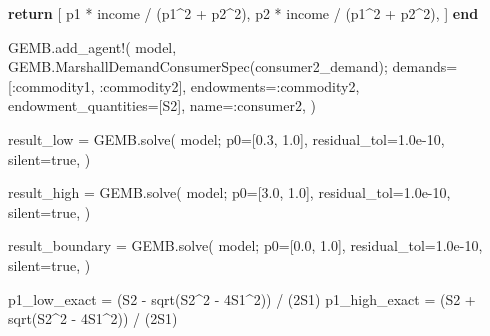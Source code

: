 \documentclass[
  letterpaper,
  DIV=11,
  numbers=noendperiod]{scrreprt}
\newenvironment{Shaded}{\begin{snugshade}}{\end{snugshade}}
\newcommand{\ConstantTok}[1]{\textcolor[rgb]{0.56,0.35,0.01}{#1}}
\newcommand{\ControlFlowTok}[1]{\textcolor[rgb]{0.00,0.23,0.31}{\textbf{#1}}}
\newcommand{\FloatTok}[1]{\textcolor[rgb]{0.68,0.00,0.00}{#1}}
\newcommand{\FunctionTok}[1]{\textcolor[rgb]{0.28,0.35,0.67}{#1}}
\newcommand{\KeywordTok}[1]{\textcolor[rgb]{0.00,0.23,0.31}{\textbf{#1}}}
\newcommand{\NormalTok}[1]{\textcolor[rgb]{0.00,0.23,0.31}{#1}}
\newcommand{\OperatorTok}[1]{\textcolor[rgb]{0.37,0.37,0.37}{#1}}
\begin{document}
\begin{codelisting}
{\begin{Shaded}
\begin{Highlighting}[]
    \ControlFlowTok{return}\NormalTok{ [}
\NormalTok{        p1 }\OperatorTok{*}\NormalTok{ income }\OperatorTok{/}\NormalTok{ (p1}\OperatorTok{\^{}}\FloatTok{2} \OperatorTok{+}\NormalTok{ p2}\OperatorTok{\^{}}\FloatTok{2}\NormalTok{),}
\NormalTok{        p2 }\OperatorTok{*}\NormalTok{ income }\OperatorTok{/}\NormalTok{ (p1}\OperatorTok{\^{}}\FloatTok{2} \OperatorTok{+}\NormalTok{ p2}\OperatorTok{\^{}}\FloatTok{2}\NormalTok{),}
\NormalTok{    ]}
\KeywordTok{end}

\NormalTok{GEMB.}\FunctionTok{add\_agent!}\NormalTok{(}
\NormalTok{    model,}
\NormalTok{    GEMB.}\FunctionTok{MarshallDemandConsumerSpec}\NormalTok{(consumer2\_demand);}
\NormalTok{    demands}\OperatorTok{=}\NormalTok{[}\OperatorTok{:}\NormalTok{commodity1, }\OperatorTok{:}\NormalTok{commodity2],}
\NormalTok{    endowments}\OperatorTok{=:}\NormalTok{commodity2,}
\NormalTok{    endowment\_quantities}\OperatorTok{=}\NormalTok{[S2],}
\NormalTok{    name}\OperatorTok{=:}\NormalTok{consumer2,}
\NormalTok{)}

\NormalTok{result\_low }\OperatorTok{=}\NormalTok{ GEMB.}\FunctionTok{solve}\NormalTok{(}
\NormalTok{    model;}
\NormalTok{    p0}\OperatorTok{=}\NormalTok{[}\FloatTok{0.3}\NormalTok{, }\FloatTok{1.0}\NormalTok{],}
\NormalTok{    residual\_tol}\OperatorTok{=}\FloatTok{1.0e{-}10}\NormalTok{,}
\NormalTok{    silent}\OperatorTok{=}\ConstantTok{true}\NormalTok{,}
\NormalTok{)}

\NormalTok{result\_high }\OperatorTok{=}\NormalTok{ GEMB.}\FunctionTok{solve}\NormalTok{(}
\NormalTok{    model;}
\NormalTok{    p0}\OperatorTok{=}\NormalTok{[}\FloatTok{3.0}\NormalTok{, }\FloatTok{1.0}\NormalTok{],}
\NormalTok{    residual\_tol}\OperatorTok{=}\FloatTok{1.0e{-}10}\NormalTok{,}
\NormalTok{    silent}\OperatorTok{=}\ConstantTok{true}\NormalTok{,}
\NormalTok{)}

\NormalTok{result\_boundary }\OperatorTok{=}\NormalTok{ GEMB.}\FunctionTok{solve}\NormalTok{(}
\NormalTok{    model;}
\NormalTok{    p0}\OperatorTok{=}\NormalTok{[}\FloatTok{0.0}\NormalTok{, }\FloatTok{1.0}\NormalTok{],}
\NormalTok{    residual\_tol}\OperatorTok{=}\FloatTok{1.0e{-}10}\NormalTok{,}
\NormalTok{    silent}\OperatorTok{=}\ConstantTok{true}\NormalTok{,}
\NormalTok{)}

\NormalTok{p1\_low\_exact }\OperatorTok{=}\NormalTok{ (S2 }\OperatorTok{{-}} \FunctionTok{sqrt}\NormalTok{(S2}\OperatorTok{\^{}}\FloatTok{2} \OperatorTok{{-}} \FloatTok{4}\NormalTok{S1}\OperatorTok{\^{}}\FloatTok{2}\NormalTok{)) }\OperatorTok{/}\NormalTok{ (}\FloatTok{2}\NormalTok{S1)}
\NormalTok{p1\_high\_exact }\OperatorTok{=}\NormalTok{ (S2 }\OperatorTok{+} \FunctionTok{sqrt}\NormalTok{(S2}\OperatorTok{\^{}}\FloatTok{2} \OperatorTok{{-}} \FloatTok{4}\NormalTok{S1}\OperatorTok{\^{}}\FloatTok{2}\NormalTok{)) }\OperatorTok{/}\NormalTok{ (}\FloatTok{2}\NormalTok{S1)}


\end{Highlighting}
\end{Shaded}}
\end{codelisting}
\end{document}
